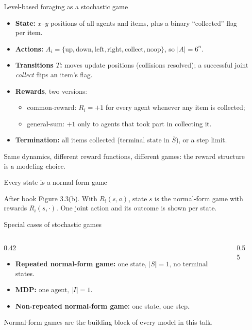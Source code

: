 \documentclass[aspectratio=169,11pt]{beamer}
\begin{document}
\begin{frame}{Level-based foraging as a stochastic game}
  \begin{itemize}
    \item \textbf{State:} $x$--$y$ positions of all agents and items, plus a binary ``collected'' flag per item.
    \item \textbf{Actions:} $A_i = \{\text{up}, \text{down}, \text{left}, \text{right}, \text{collect}, \text{noop}\}$, so $|A| = 6^n$.
    \item \textbf{Transitions $T$:} moves update positions (collisions resolved); a successful joint \emph{collect} flips an item's flag.
    \item \textbf{Rewards}, two versions:
      \begin{itemize}
        \item common-reward: $R_i = +1$ for every agent whenever any item is collected;
        \item general-sum: $+1$ only to agents that took part in collecting it.
      \end{itemize}
    \item \textbf{Termination:} all items collected (terminal state in $\bar S$), or a step limit.
  \end{itemize}
  \bigskip
  Same dynamics, different reward functions, different games: the reward structure is a modeling choice.
\end{frame}

\begin{frame}{Every state is a normal-form game}
  \centering
  
  \medskip

  \small After book Figure 3.3(b). With $R_i(s,a)$, state $s$ is the normal-form game with rewards $R_i(s, \cdot)$. One joint action and its outcome is shown per state.
\end{frame}

\begin{frame}{Special cases of stochastic games}
  \begin{columns}[c]
    \begin{column}{0.42\textwidth}
      \begin{itemize}
        \item \textbf{Repeated normal-form game:} one state, $|S| = 1$, no terminal states.
        \item \textbf{MDP:} one agent, $|I| = 1$.
        \item \textbf{Non-repeated normal-form game:} one state, one step.
      \end{itemize}
      \bigskip
      Normal-form games are the building block of every model in this talk.
    \end{column}
    \begin{column}{0.55\textwidth}
      \centering
      
    \end{column}
  \end{columns}
\end{frame}
\end{document}
